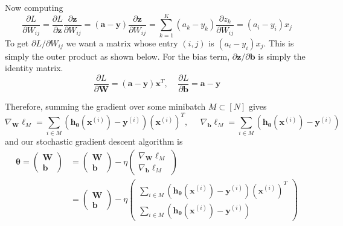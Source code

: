 \documentclass{article}
\begin{document}
\begin{theorem}
\begin{center}
    \end{center}
    Now computing 
    \begin{equation}
      \frac{\partial L}{\partial W_{ij}} = \frac{\partial L}{\partial \mathbf{z}} \frac{\partial \mathbf{z}}{\partial W_{ij}} = (\mathbf{a} - \mathbf{y}) \frac{\partial \mathbf{z}}{\partial W_{ij}} = \sum_{k=1}^K (a_k - y_k) \frac{\partial z_k}{\partial W_{ij}} = (a_i - y_i) x_j
    \end{equation}
    To get $\partial L / \partial W_{ij}$ we want a matrix whose entry $(i, j)$ is $(a_i - y_i) x_j$. This is simply the outer product as shown below. For the bias term, $\partial \mathbf{z} / \partial \mathbf{b}$ is simply the identity matrix. 
    \begin{equation}
      \frac{\partial L}{\partial \mathbf{W}} = (\mathbf{a} - \mathbf{y}) \mathbf{x}^T, \;\;\;\; \frac{\partial L}{\partial \mathbf{b}} = \mathbf{a} - \mathbf{y}
    \end{equation}

    Therefore, summing the gradient over some minibatch $M \subset [N]$ gives 
    \begin{equation}
      \nabla_{\mathbf{W}} \ell_M = \sum_{i \in M} (\mathbf{h}_{\boldsymbol{\theta}}(\mathbf{x}^{(i)}) - \mathbf{y}^{(i)}) (\mathbf{x}^{(i)})^T, \;\;\;\;\; \nabla_{\mathbf{b}} \ell_M = \sum_{i \in M} (\mathbf{h}_{\boldsymbol{\theta}}(\mathbf{x}^{(i)}) - \mathbf{y}^{(i)})
    \end{equation}
    and our stochastic gradient descent algorithm is 
    \begin{align*}
      \boldsymbol{\theta} = \begin{pmatrix} \mathbf{W} \\ \mathbf{b} \end{pmatrix} & = \begin{pmatrix} \mathbf{W} \\ \mathbf{b} \end{pmatrix} - \eta \begin{pmatrix} \nabla_{\mathbf{W}} \ell_M \\ \nabla_{\mathbf{b}} \ell_M \end{pmatrix} \\
      & = \begin{pmatrix} \mathbf{W} \\ \mathbf{b} \end{pmatrix} - \eta \begin{pmatrix} \sum_{i \in M} (\mathbf{h}_{\boldsymbol{\theta}}(\mathbf{x}^{(i)}) - \mathbf{y}^{(i)}) (\mathbf{x}^{(i)})^T \\ \sum_{i \in M} (\mathbf{h}_{\boldsymbol{\theta}}(\mathbf{x}^{(i)}) - \mathbf{y}^{(i)}) \end{pmatrix} 
    \end{align*}
  \end{theorem}
\end{document}
